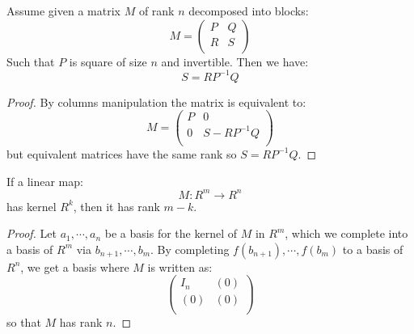 \begin{lemma}\label{rank-bloc-matrix}
Assume given a matrix $M$ of rank $n$ decomposed into blocks:
\[M = \begin{pmatrix}
P & Q  \\
R & S \\
\end{pmatrix}\]
Such that $P$ is square of size $n$ and invertible. Then we have:
\[S = RP^{-1}Q\]
\end{lemma}

\begin{proof}
By columns manipulation the matrix is equivalent to:
\[M = \begin{pmatrix}
P & 0  \\
0 & S - RP^{-1}Q \\
\end{pmatrix}\]
but equivalent matrices have the same rank so $S=RP^{-1}Q$.
\end{proof}

\begin{lemma}
If a linear map:
\[M:R^m \to R^n\]
has kernel $R^k$, then it has rank $m-k$.
\end{lemma}

\begin{proof}
Let $a_1,\cdots,a_n$ be a basis for the kernel of $M$ in $R^m$, which we complete into a basis of $R^m$ via $b_{n+1},\cdots,b_m$. By completing $f(b_{n+1}),\cdots, f(b_m)$ to a basis of $R^n$, we get a basis where $M$ is written as:
\[\begin{pmatrix}
I_n & (0)  \\
(0) & (0) \\
\end{pmatrix}\]
so that $M$ has rank $n$.
\end{proof}









